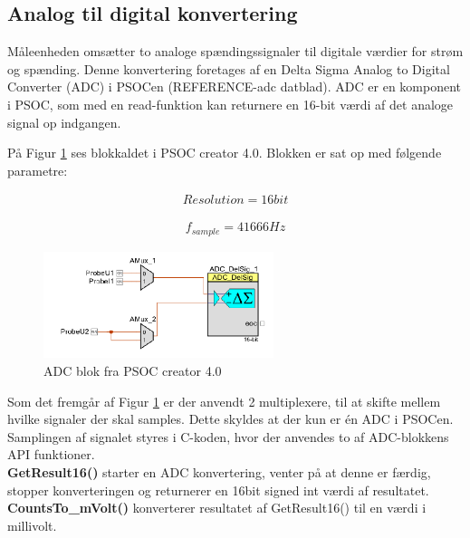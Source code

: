 
\subsection{Analog til digital konvertering}

Måleenheden omsætter to analoge spændingssignaler til digitale værdier for strøm og spænding. Denne konvertering foretages af en Delta Sigma Analog to Digital Converter (ADC) i PSOCen (REFERENCE-adc datblad).  ADC er en komponent i PSOC, som med en read-funktion kan returnere en 16-bit værdi af det analoge signal op indgangen. 

På Figur \ref{fig:MEADC} ses blokkaldet i PSOC creator 4.0. Blokken er sat op med følgende parametre:

\begin{align}
Resolution = 16bit
\end{align}

\begin{align}
f_{sample} = 41666 Hz
\end{align}

\begin{figure}[htbp] %
	\centering
	\includegraphics[width=0.6\textwidth]{Figure/MEADC}
	\caption{ADC blok fra PSOC creator 4.0}
	\label{fig:MEADC}
\end{figure}

Som det fremgår af Figur \ref{fig:MEADC} er der anvendt 2 multiplexere, til at skifte mellem hvilke signaler der skal samples. Dette skyldes at der kun er én ADC i PSOCen. Samplingen af signalet styres i C-koden, hvor der anvendes to af ADC-blokkens API funktioner. 
\\

\textbf{GetResult16() }starter en ADC konvertering, venter på at denne er færdig, stopper konverteringen og returnerer en 16bit signed int værdi af resultatet. 
\\

\textbf{CountsTo\_mVolt()} konverterer resultatet af GetResult16() til en værdi i millivolt. 
\\

